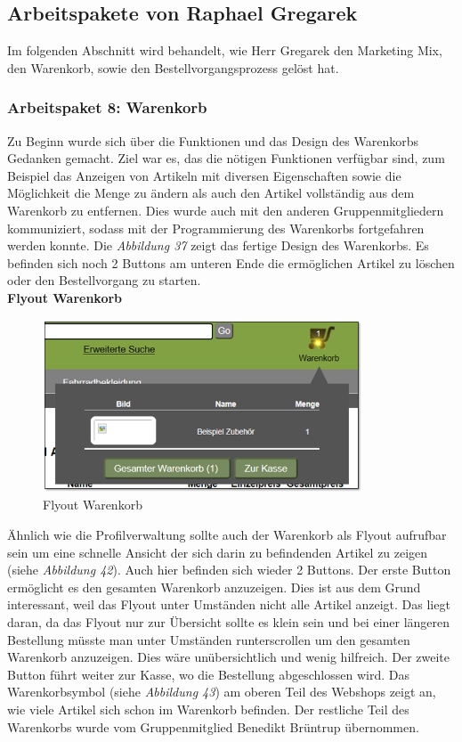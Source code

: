 \newpage
\subsection{Arbeitspakete von Raphael Gregarek}
Im folgenden Abschnitt wird behandelt, wie Herr Gregarek den Marketing Mix, den Warenkorb, sowie den Bestellvorgangsprozess gelöst hat.

\subsubsection{Arbeitspaket 8: Warenkorb}
Zu Beginn wurde sich über die Funktionen und das Design des Warenkorbs Gedanken gemacht. Ziel war es, das die nötigen Funktionen verfügbar sind, zum Beispiel das Anzeigen von Artikeln mit diversen Eigenschaften sowie die Möglichkeit die Menge zu ändern als auch den Artikel vollständig aus dem Warenkorb zu entfernen. Dies wurde auch mit den anderen Gruppenmitgliedern kommuniziert, sodass mit der Programmierung des Warenkorbs fortgefahren werden konnte. Die \textit{Abbildung 37} zeigt das fertige Design des Warenkorbs. Es befinden sich noch 2 Buttons am unteren Ende die ermöglichen Artikel zu löschen oder den Bestellvorgang zu starten.\\

\textbf{Flyout Warenkorb}\\
\begin{figure}[H]
	\begin{center}
			\includegraphics[width=95mm]{Bilder/warenkorb_flyout.png}
	\end{center}
	\caption{Flyout Warenkorb}
\end{figure}

Ähnlich wie die Profilverwaltung sollte auch der Warenkorb als Flyout aufrufbar sein um eine schnelle Ansicht der sich darin zu befindenden Artikel zu zeigen (siehe \textit{Abbildung 42}). Auch hier befinden sich wieder 2 Buttons. Der erste Button ermöglicht es den gesamten Warenkorb anzuzeigen. Dies ist aus dem Grund interessant, weil das Flyout unter Umständen nicht alle Artikel anzeigt. Das liegt daran, da das Flyout nur zur Übersicht sollte es klein sein und bei einer längeren Bestellung müsste man unter Umständen runterscrollen um den gesamten Warenkorb anzuzeigen. Dies wäre unübersichtlich und wenig hilfreich. Der zweite Button führt weiter zur Kasse, wo die Bestellung abgeschlossen wird. Das Warenkorbsymbol  (siehe \textit{Abbildung 43}) am oberen Teil des Webshops zeigt an, wie viele Artikel sich schon im Warenkorb befinden. Der restliche Teil des Warenkorbs wurde vom Gruppenmitglied Benedikt Brüntrup übernommen.

